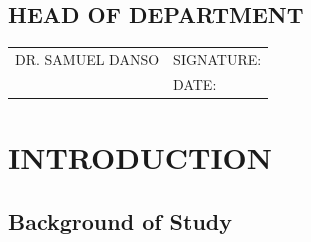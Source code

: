 \documentclass[a4paper,12pt]{article}  %
\begin{document}
\vspace{1cm}

\subsection*{HEAD OF DEPARTMENT}
\begin{tabular}{l l}
      \vspace{1cm}
      DR. SAMUEL DANSO & SIGNATURE: \underline{\hspace{5cm}} \\
                       & DATE: \underline{\hspace{5cm}}      \\
\end{tabular}
\newpage
\tableofcontents
\newpage
\section{INTRODUCTION}
\subsection{Background of Study}
\end{document}

